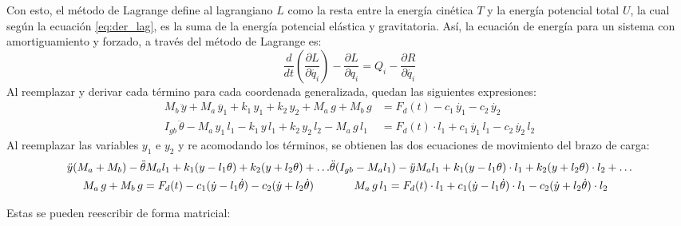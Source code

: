 Con esto, el método de Lagrange define al lagrangiano $L$ como la resta entre la energía cinética $T$ y la energía potencial total $U$, la cual según la ecuación \ref{eq:der_lag}, es la suma de la energía potencial elástica y gravitatoria. Así, la ecuación de energía para un sistema con amortiguamiento y forzado, a través del método de Lagrange es:
\begin{equation}
	\frac{d}{dt}\left(\frac{\partial L}{\partial \dot{q_i}}\right) - \frac{\partial L}{\partial q_i} = Q_i - \frac{\partial R}{\partial \dot{q_i}}
\end{equation}
Al reemplazar y derivar cada término para cada coordenada generalizada, quedan las siguientes expresiones:
\begin{subequations}
\begin{align}
	M_b\, \ddot{y} + M_a\, \ddot{y_1} + k_1\, y_1 + k_2\, y_2 + M_a\, g + M_b\, g &= F_d(t) - c_1\, \dot{y_1} - c_2\, \dot{y_2} \\
	I_{gb}\, \ddot{\theta} - M_a\, y_1\, l_1 - k_1\, y\, l_1 + k_2\, y_2\, l_2 - M_a\, g\, l_1 &= F_d(t)\cdot l_1 + c_1\, \dot{y_1}\, l_1 - c_2\, \dot{y_2}\, l_2 
\end{align}
\end{subequations}
Al reemplazar las variables $y_1$ e $y_2$ y re acomodando los términos, se obtienen las dos ecuaciones de movimiento del brazo de carga:
\begin{subequations}
\begin{multline}\label{eq:mov_y}
	\ddot{y}(M_a + M_b) - \ddot{\theta}M_al_1 + k_1(y - l_1\theta) + k_2(y + l_2\theta) + \dots \\
	 M_a\, g + M_b\, g = F_d(t) - c_1(\dot{y} - l_1\dot{\theta}) - c_2(\dot{y} + l_2\dot{\theta}) 
\end{multline} 
\vspace{-17mm}
\begin{multline}\label{eq:mov_theta}
	\ddot{\theta}(I_{gb} - M_al_1) - \ddot{y}M_al_1 + k_1(y - l_1\theta)\cdot l_1 + k_2(y + l_2\theta)\cdot l_2 + \dots \\
	M_a\, g\, l_1 = F_d(t)\cdot l_1 + c_1(\dot{y} - l_1\dot{\theta})\cdot l_1 - c_2(\dot{y} + l_2\dot{\theta})\cdot l_2 
\end{multline}
\end{subequations}

Estas se pueden reescribir de forma matricial:


